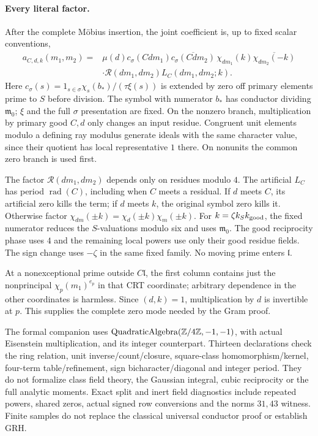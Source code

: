 \paragraph{Every literal factor.}
After the complete M\"obius insertion, the joint coefficient is, up to
fixed scalar conventions,
\begin{align*}
 a_{C,d,k}(m_1,m_2)={}&\mu(d)c_\sigma(Cdm_1)
       \overline{c_\sigma(Cdm_2)}\,
       \chi_{dm_1}(k)\overline{\chi_{dm_2}(-k)}\\
 &\cdot\mathcal R(dm_1,dm_2)L_C(dm_1,dm_2;k).
\end{align*}
Here $c_\sigma(s)=1_{s\in\sigma}\chi_s(b_*)/(\tau\xi(s))$ is
extended by zero off primary elements prime to $S$ before division.
The symbol with numerator $b_*$ has conductor dividing $\mathfrak m_0$;
$\xi$ and the full $\sigma$ presentation are fixed.
On the nonzero branch, multiplication by primary good $C,d$ only
changes an input residue. Congruent unit elements modulo a defining
ray modulus generate ideals with the same character value, since
their quotient has local representative $1$ there. On nonunits the
common zero branch is used first.

The factor $\mathcal R(dm_1,dm_2)$ depends only on residues modulo $4$.
The artificial $L_C$ has period $\operatorname{rad}(C)$, including
when $C$ meets a residual. If $d$ meets $C$, its artificial zero kills
the term; if $d$ meets $k$, the original symbol zero kills it.
Otherwise factor $\chi_{dm}(\pm k)=\chi_d(\pm k)\chi_m(\pm k)$.
For $k=\zeta k_Sk_{\rm good}$, the fixed numerator reduces the
$S$-valuations modulo six and uses $\mathfrak m_0$.
The good reciprocity phase uses $4$ and the remaining local powers use
only their good residue fields. The sign change uses $-\zeta$ in the
same fixed family. No moving prime enters $\mathfrak l$.

At a nonexceptional prime outside $C\mathfrak l$, the first column
contains just the nonprincipal $\chi_p(m_1)^{e_p}$ in that CRT
coordinate; arbitrary dependence in the other coordinates is harmless.
Since $(d,k)=1$, multiplication by $d$ is invertible at $p$.
This supplies the complete zero mode needed by the Gram proof.

The formal companion uses
$\operatorname{QuadraticAlgebra}(\mathbb Z/4\mathbb Z,-1,-1)$, with actual
Eisenstein multiplication, and its integer counterpart.
Thirteen declarations check the ring relation, unit inverse/count/closure,
square-class homomorphism/kernel, four-term table/refinement, sign
bicharacter/diagonal and integer period.
They do not formalize class field theory, the Gaussian integral,
cubic reciprocity or the full analytic moments. Exact split and inert
field diagnostics include repeated powers, shared zeros, actual signed
row conversions and the norms $31,43$ witness. Finite samples do not
replace the classical universal conductor proof or establish GRH.

